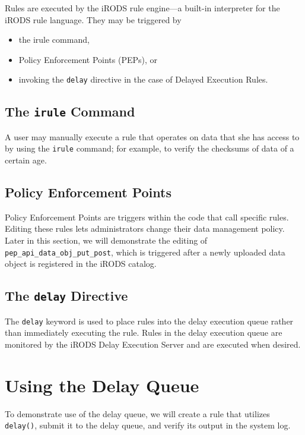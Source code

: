 \documentclass[10pt,oneside]{memoir}
\begin{document}
Rules are executed by the iRODS rule engine---a built-in interpreter for the iRODS rule language. They may be triggered by
\begin{itemize}
 \item the irule command,
 \item Policy Enforcement Points (PEPs), or
 \item invoking the \texttt{delay} directive in the case of Delayed Execution Rules.
\end{itemize}

\subsection{The \texttt{irule} Command}

A user may manually execute a rule that operates on data that she has access to by using the \texttt{irule} command; for example, to verify the checksums of data of a certain age.

\subsection{Policy Enforcement Points}

Policy Enforcement Points are triggers within the code that call specific rules. Editing these rules lets administrators change their data management policy. Later in this section, we will demonstrate the editing of \texttt{pep\_api\_data\_obj\_put\_post}, which is triggered after a newly uploaded data object is registered in the iRODS catalog.

\subsection{The \texttt{delay} Directive}

The \texttt{delay} keyword is used to place rules into the delay execution queue rather than immediately executing the rule. Rules in the delay execution queue are monitored by the iRODS Delay Execution Server and are executed when desired.

\section{Using the Delay Queue}

To demonstrate use of the delay queue, we will create a rule that utilizes \texttt{delay()}, submit it to the delay queue, and verify its output in the system log.
\end{document}
